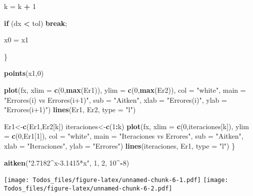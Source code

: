 \documentclass[]{article}
\newenvironment{Shaded}{\begin{snugshade}}{\end{snugshade}}
\newcommand{\ControlFlowTok}[1]{\textcolor[rgb]{0.13,0.29,0.53}{\textbf{#1}}}
\newcommand{\DataTypeTok}[1]{\textcolor[rgb]{0.13,0.29,0.53}{#1}}
\newcommand{\DecValTok}[1]{\textcolor[rgb]{0.00,0.00,0.81}{#1}}
\newcommand{\KeywordTok}[1]{\textcolor[rgb]{0.13,0.29,0.53}{\textbf{#1}}}
\newcommand{\NormalTok}[1]{#1}
\newcommand{\OperatorTok}[1]{\textcolor[rgb]{0.81,0.36,0.00}{\textbf{#1}}}
\newcommand{\StringTok}[1]{\textcolor[rgb]{0.31,0.60,0.02}{#1}}
\begin{document}
\begin{Shaded}
\begin{Highlighting}[]
\NormalTok{    k =}\StringTok{ }\NormalTok{k }\OperatorTok{+}\StringTok{ }\DecValTok{1}
    
    \ControlFlowTok{if}\NormalTok{ (dx }\OperatorTok{<}\StringTok{ }\NormalTok{tol) }\ControlFlowTok{break}\NormalTok{;}
    
\NormalTok{    x0 =}\StringTok{ }\NormalTok{x1}
    
    
\NormalTok{  \}}
  
  \KeywordTok{points}\NormalTok{(x1,}\DecValTok{0}\NormalTok{)}
  
  \KeywordTok{plot}\NormalTok{(fx, }\DataTypeTok{xlim =} \KeywordTok{c}\NormalTok{(}\DecValTok{0}\NormalTok{,}\KeywordTok{max}\NormalTok{(Er1)), }\DataTypeTok{ylim =} \KeywordTok{c}\NormalTok{(}\DecValTok{0}\NormalTok{,}\KeywordTok{max}\NormalTok{(Er2)), }\DataTypeTok{col =} \StringTok{"white"}\NormalTok{, }\DataTypeTok{main =} \StringTok{"Errores(i) vs Errores(i+1)"}\NormalTok{, }\DataTypeTok{sub =} \StringTok{"Aitken"}\NormalTok{, }\DataTypeTok{xlab =} \StringTok{"Errores(i)"}\NormalTok{, }\DataTypeTok{ylab =} \StringTok{"Errores(i+1)"}\NormalTok{)}
  \KeywordTok{lines}\NormalTok{(Er1, Er2, }\DataTypeTok{type =} \StringTok{"l"}\NormalTok{)}
  
\NormalTok{  Er1<-}\KeywordTok{c}\NormalTok{(Er1,Er2[k])}
\NormalTok{  iteraciones<-}\KeywordTok{c}\NormalTok{(}\DecValTok{1}\OperatorTok{:}\NormalTok{k)}
  \KeywordTok{plot}\NormalTok{(fx, }\DataTypeTok{xlim =} \KeywordTok{c}\NormalTok{(}\DecValTok{0}\NormalTok{,iteraciones[k]), }\DataTypeTok{ylim =} \KeywordTok{c}\NormalTok{(}\DecValTok{0}\NormalTok{,Er1[}\DecValTok{1}\NormalTok{]), }\DataTypeTok{col =} \StringTok{"white"}\NormalTok{, }\DataTypeTok{main =} \StringTok{"Iteraciones vs Errores"}\NormalTok{, }\DataTypeTok{sub =} \StringTok{"Aitken"}\NormalTok{, }\DataTypeTok{xlab =} \StringTok{"Iteraciones"}\NormalTok{, }\DataTypeTok{ylab =} \StringTok{"Errores"}\NormalTok{)}
  \KeywordTok{lines}\NormalTok{(iteraciones, Er1, }\DataTypeTok{type =} \StringTok{"l"}\NormalTok{)}
\NormalTok{\}}

\KeywordTok{aitken}\NormalTok{(}\StringTok{"2.7182^x-3.1415*x"}\NormalTok{, }\DecValTok{1}\NormalTok{, }\DecValTok{2}\NormalTok{, }\DecValTok{10}\OperatorTok{^-}\DecValTok{8}\NormalTok{)}
\end{Highlighting}
\end{Shaded}

\texttt{[image: Todos\_files/figure-latex/unnamed-chunk-6-1.pdf]}
\texttt{[image: Todos\_files/figure-latex/unnamed-chunk-6-2.pdf]}
\end{document}
